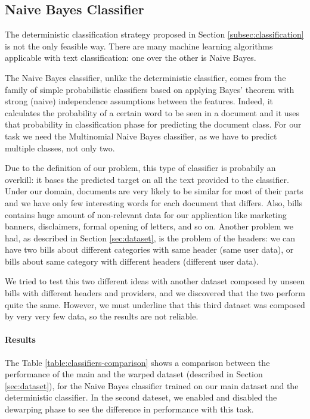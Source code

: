\documentclass[10pt,twocolumn,letterpaper]{article}
\begin{document}
\subsection{Naive Bayes Classifier}
\label{subsec:naive-bayes-classifier}

The deterministic classification strategy proposed in Section
\ref{subsec:classification} is not the only feasible way. There are
many machine learning algorithms applicable with text classification:
one over the other is Naive Bayes.

The Naive Bayes classifier, unlike the deterministic classifier, comes
from the family of simple probabilistic classifiers based on applying
Bayes' theorem with strong (naive) independence assumptions between
the features. Indeed, it calculates the probability of a certain word
to be seen in a document and it uses that probability in
classification phase for predicting the document class. For our task
we need the Multinomial Naive Bayes classifier, as we have to predict
multiple classes, not only two.

Due to the definition of our problem, this type of classifier
is probabily an overkill: it bases the predicted target on all the
text provided to the classifier. Under our domain, documents are very
likely to be similar for most of their parts and we have only few
interesting words for each document that differs. Also, bills contains
huge amount of non-relevant data for our application like marketing
banners, disclaimers, formal opening of letters, and so on. Another
problem we had, as described in Section \ref{sec:dataset}, is the
problem of the headers: we can have two bills about different
categories with same header (same user data), or bills about same
category with different headers (different user data).

We tried to test this two different ideas with another dataset
composed by unseen bills with different headers and providers, and we
discovered that the two perform quite the same. However, we must
underline that this third dataset was composed by very very few data,
so the results are not reliable.

\paragraph{Results}

The Table \ref{table:classifiers-comparison} shows a comparison
between the performance of the main and the warped dataset (described
in Section \ref{sec:dataset}), for the Naive Bayes classifier trained
on our main dataset and the deterministic classifier. In the second
dateset, we enabled and disabled the dewarping phase to see the
difference in performance with this task.
\end{document}
